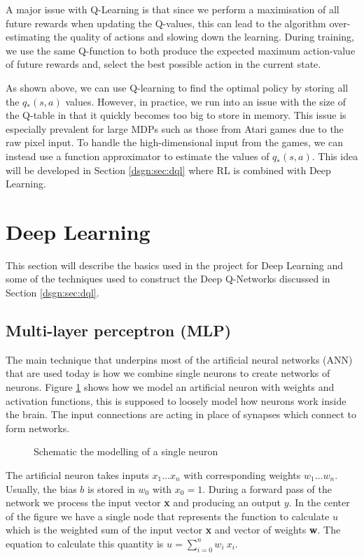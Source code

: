 A major issue with Q-Learning is that since we perform a maximisation of all future rewards when updating the Q-values, this can lead to the algorithm over-estimating the quality of actions and slowing down the learning. During training, we use the same Q-function to both produce the expected maximum action-value of future rewards and, select the best possible action in the current state.



As shown above, we can use Q-learning to find the optimal policy by storing all the $q_*(s, a)$ values. However, in practice, we run into an issue with the size of the Q-table in that it quickly becomes too big to store in memory. This issue is especially prevalent for large MDPs such as those from Atari games due to the raw pixel input. To handle the high-dimensional input from the games, we can instead use a function approximator to estimate the values of $q_*(s, a)$. This idea will be developed in Section \ref{dsgn:sec:dql} where RL is combined with Deep Learning.

\section{Deep Learning}
\label{dsgn:sec:dl}
This section will describe the basics used in the project for Deep Learning and some of the techniques used to construct the Deep Q-Networks discussed in Section \ref{dsgn:sec:dql}.

\subsection{Multi-layer perceptron (MLP)}
\label{dsgn:sec:dl:mlp}
The main technique that underpins most of the artificial neural networks (ANN) that are used today is how we combine single neurons to create networks of neurons. Figure \ref{fig:neuron} shows how we model an artificial neuron with weights and activation functions, this is supposed to loosely model how neurons work inside the brain. The input connections are acting in place of synapses which connect to form networks.

\begin{figure}[ht!]
	\centering
	\caption{Schematic the modelling of a single neuron} \label{fig:neuron}
\end{figure}

The artificial neuron takes inputs $x_1 \hdots x_n$ with corresponding weights $w_1 \hdots w_n$. Usually, the bias $b$ is stored in $w_0$ with $x_0 = 1$. During a forward pass of the network we process the input vector \textbf{x} and producing an output $y$. In the center of the figure we have a single node that represents the function to calculate $u$ which is the weighted sum of the input vector \textbf{x} and vector of weights \textbf{w}. The equation to calculate this quantity is $u = \sum_{i=0}^n w_i~x_i$.


